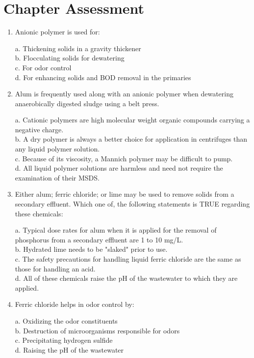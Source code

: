 \section*{Chapter Assessment}
\begin{tcolorbox}[breakable, enhanced,
colframe=blue!25,
colback=blue!10,
coltitle=blue!20!black,  
title= Chapter Assessment]

\begin{enumerate}
\item Anionic polymer is used for:

a. Thickening solids in a gravity thickener \\
b. Flocculating solids for dewatering \\
c. For odor control \\
d. For enhancing solids and BOD removal in the primaries 


\item Alum is frequently used along with an anionic polymer when dewatering anaerobically digested sludge using a belt press. 

a. Cationic polymers are high molecular weight organic compounds carrying a negative charge. \\
b. A dry polymer is always a better choice for application in centrifuges than any liquid polymer solution. \\
c. Because of its viscosity, a Mannich polymer may be difficult to pump. \\
d. All liquid polymer solutions are harmless and need not require the examination of their MSDS. 

\item Either alum; ferric chloride; or lime may be used to remove solids from a secondary effluent. Which one of, the following statements is TRUE regarding these chemicals: 

a. Typical dose rates for alum when it is applied for the removal of phosphorus from a secondary effluent are 1 to 10 mg/L. \\
b. Hydrated lime needs to be "slaked" prior to use. \\
c. The safety precautions for handling liquid ferric chloride are the same as those for handling an acid. \\
d. All of these chemicals raise the pH of the wastewater to which they are applied. 

\item Ferric chloride helps in odor control by:

a. Oxidizing the odor constituents \\
b. Destruction of microorganisms responsible for odors \\
c. Precipitating hydrogen sulfide \\
d. Raising the pH of the wastewater 



\end{enumerate}
\end{tcolorbox}
